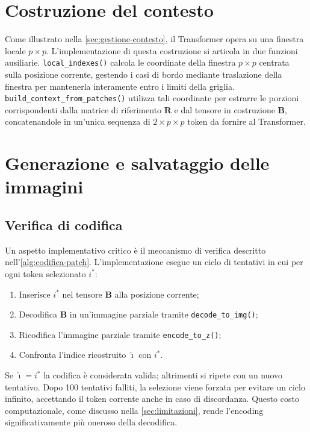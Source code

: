 \section{Costruzione del contesto}
\label{sec:costruzione-contesto}

Come illustrato nella \autoref{sec:gestione-contesto}, il Transformer opera su una finestra locale $p \times p$. L'implementazione di questa costruzione si articola in due funzioni ausiliarie. \texttt{local\_indexes()} calcola le coordinate della finestra $p \times p$ centrata sulla posizione corrente, gestendo i casi di bordo mediante traslazione della finestra per mantenerla interamente entro i limiti della griglia. \texttt{build\_context\_from\_patches()} utilizza tali coordinate per estrarre le porzioni corrispondenti dalla matrice di riferimento $\mathbf{R}$ e dal tensore in costruzione $\mathbf{B}$, concatenandole in un'unica sequenza di $2 \times p \times p$ token da fornire al Transformer.

\section{Generazione e salvataggio delle immagini}
\label{sec:generazione-immagini}

\subsection{Verifica di codifica}

Un aspetto implementativo critico è il meccanismo di verifica descritto nell'\autoref{alg:codifica-patch}. L'implementazione esegue un ciclo di tentativi in cui per ogni token selezionato $i^*$:
\begin{enumerate}
	\item Inserisce $i^*$ nel tensore $\mathbf{B}$ alla posizione corrente;
	\item Decodifica $\mathbf{B}$ in un'immagine parziale tramite \texttt{decode\_to\_img()};
	\item Ricodifica l'immagine parziale tramite \texttt{encode\_to\_z()};
	\item Confronta l'indice ricostruito $\hat{\imath}$ con $i^*$.
\end{enumerate}
Se $\hat{\imath} = i^*$ la codifica è considerata valida; altrimenti si ripete con un nuovo tentativo. Dopo 100 tentativi falliti, la selezione viene forzata per evitare un ciclo infinito, accettando il token corrente anche in caso di discordanza. Questo costo computazionale, come discusso nella \autoref{sec:limitazioni}, rende l'encoding significativamente più oneroso della decodifica.

